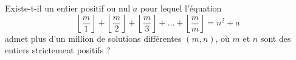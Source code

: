 Existe-t-il un entier positif ou nul $a$ pour lequel l'équation
\[ \left\lfloor\frac{m}{1}\right\rfloor + \left\lfloor\frac{m}{2}\right\rfloor + \left\lfloor\frac{m}{3}\right\rfloor + \dots + \left\lfloor\frac{m}{m}\right\rfloor = n^2 + a \]
admet plus d'un million de solutions différentes $(m, n)$, où $m$ et $n$ sont des entiers strictement positifs ?
